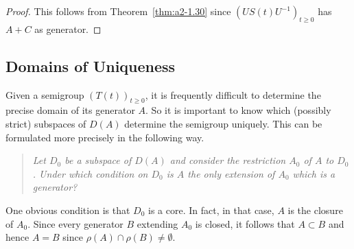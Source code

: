 \begin{proof}
This follows from Theorem~\ref{thm:a2-1.30}   since 
$(US(t)U^{-1})_{t\geq 0}$ has $A+C$ as generator.
\end{proof}
\subsection{Domains of Uniqueness} \label{subsec:a2-1.se9}%
Given a semigroup $(T(t))_{t \geq 0}$,  
it is frequently difficult to determine the precise domain of its generator $A$.
So it is important to know which (possibly strict) subspaces of\/ $D(A)$ determine the semigroup uniquely.
This can be formulated more precisely in the following way.
\begin{quote}
\textit{Let $D_{0}$ be a subspace of\/ $D(A)$ and consider the restriction $A_{0}$ of\/ $A$ to $D_{0}$.
Under which condition on $D_{0}$ is $A$ the only extension of\/ $A_{0}$ which is a generator?}
\end{quote}
One obvious condition is that $D_{0}$ is a core.
In fact, in that case, $A$ is the closure of\/ $A_{0}$.
Since every generator $B$ extending $A_{0}$ is closed, it follows that $A \subset B$ and hence $A = B$ since 
$\rho(A) \cap \rho(B) \neq \emptyset$.

